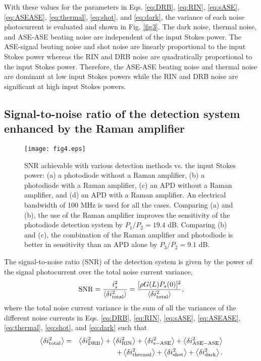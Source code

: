 \documentclass[10pt,letterpaper]{article}
\begin{document}
With these values for the parameters in Eqs. \ref{eq:DRB}, \ref{eq:RIN}, \ref{eq:sASE}, \ref{eq:ASEASE}, \ref{eq:thermal}, \ref{eq:shot}, and \ref{eq:dark}, the variance of each noise photocurrent is evaluated and shown in Fig. \ref{fig3}. The dark noise, thermal noise, and ASE-ASE beating noise are independent of the input Stokes power. The ASE-signal beating noise and shot noise are linearly proportional to the input Stokes power whereas the RIN and DRB noise are quadratically proportional to the input Stokes power. Therefore, the ASE-ASE beating noise and thermal noise are dominant at low input Stokes powers while the RIN and DRB noise are significant at high input Stokes powers. 

\subsection{Signal-to-noise ratio of the detection system enhanced by the Raman amplifier}

\begin{figure}[t]
\centering\texttt{[image: fig4.eps]}
\caption{SNR achievable with various detection methods vs. the input Stokes power: (a) a photodiode without a Raman amplifier, (b) a photodiode with a Raman amplifier, (c) an APD without a Raman amplifier, and (d) an APD with a Raman amplifier. An electrical bandwidth of 100 MHz is used for all the cases. Comparing (a) and (b), the use of the Raman amplifier improves the sensitivity of the photodiode detection system by $P_1/P_2=19.4$ dB. Comparing (b) and (c), the combination of the Raman amplifier and photodiode is better in sensitivity than an APD alone by $P_3/P_2=9.1$ dB.}
\label{fig4}
\end{figure}

The signal-to-noise ratio (SNR) of the detection system is given by the power of the signal photocurrent over the total noise current variance,
\begin{equation}
{\rm SNR} = \frac{i_s^2}{\left\langle \delta i_{\rm total}^2\right\rangle}=\frac{[\rho G(L) P_s(0)]^2}{\left\langle \delta i_{\rm total}^2\right\rangle},
\end{equation}
where the total noise current variance is the sum of all the variances of the different noise currents in Eqs. \ref{eq:DRB}, \ref{eq:RIN}, \ref{eq:sASE}, \ref{eq:ASEASE}, \ref{eq:thermal}, \ref{eq:shot}, and \ref{eq:dark} such that
\begin{eqnarray}
\left\langle \delta i_{\rm total}^2\right\rangle &=&\left\langle \delta i_{\rm DRB}^2\right\rangle+\left\langle \delta i_{\rm RIN}^2\right\rangle+\left\langle \delta i_{\rm s-ASE}^2\right\rangle+\left\langle \delta i_{\rm ASE-ASE}^2\right\rangle \nonumber\\
&&+\left\langle \delta i_{\rm thermal}^2\right\rangle+\left\langle \delta i_{\rm shot}^2\right\rangle+\left\langle \delta i_{\rm dark}^2\right\rangle.
\end{eqnarray}
\end{document}
